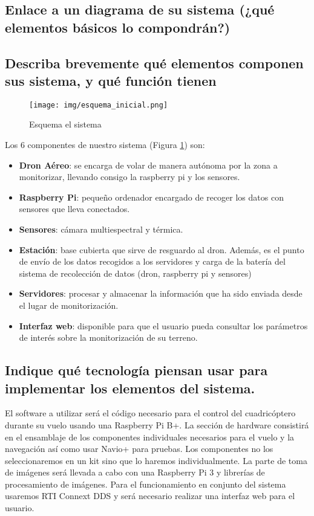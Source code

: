 \documentclass[11pt,spanish]{article} %
\begin{document}
\subsection{Enlace a un diagrama de su sistema (¿qué elementos básicos lo compondrán?)} 

\subsection{Describa brevemente qué elementos componen sus sistema, y qué función tienen}

\begin{figure}
	\centering
	\texttt{[image: img/esquema\_inicial.png]}
	\caption{Esquema el sistema}
	\label{fig:esquema_inicial}
\end{figure}

Los 6 componentes de nuestro sistema (Figura \ref{fig:esquema_inicial}) son:
\begin{itemize}
\item \textbf{Dron Aéreo}: se encarga de volar de manera autónoma por la zona a monitorizar, llevando consigo la raspberry pi y los sensores.

\item \textbf{Raspberry Pi}: pequeño ordenador encargado de recoger los datos con sensores que lleva conectados.

\item \textbf{Sensores}: cámara multiespectral y térmica. 

\item \textbf{Estación}: base cubierta que sirve de resguardo al dron. Además, es el punto de envío de los datos recogidos a los servidores y carga de la batería del sistema de recolección de datos (dron, raspberry pi  y sensores)

\item \textbf{Servidores}: procesar y almacenar la información que ha sido enviada desde el lugar de monitorización.

\item \textbf{Interfaz web}: disponible para que el usuario pueda consultar los parámetros de interés sobre la monitorización de su terreno.
\end{itemize}

\subsection{Indique qué tecnología piensan usar para implementar los elementos del sistema.}
El software a utilizar será el código necesario para el control del cuadricóptero durante su vuelo usando una Raspberry Pi B+. La sección de hardware consistirá en el ensamblaje de los componentes individuales necesarios para el vuelo y la navegación así como usar Navio+ para pruebas. Los componentes no los seleccionaremos en un kit sino que lo haremos individualmente. La parte de toma de imágenes será llevada a cabo con una Raspberry Pi 3 y librerías de procesamiento de imágenes. Para el funcionamiento en conjunto del sistema usaremos RTI Connext DDS y será necesario realizar una interfaz web para el usuario.
\end{document}
